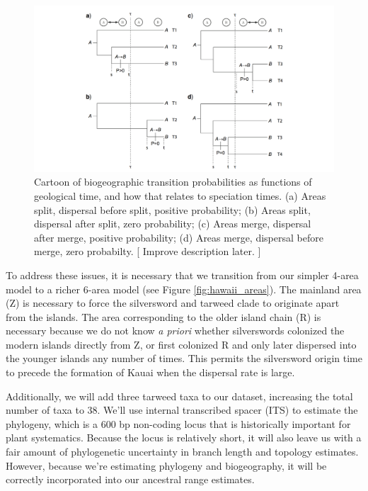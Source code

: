 \begin{figure}[!ht]
\centering
\includegraphics[width=\textwidth]{figures/fig_biogeo_dating.png}
\caption{Cartoon of biogeographic transition probabilities as functions of geological time, and how that relates to speciation times. (a) Areas split, dispersal before split, positive probability; (b) Areas split, dispersal after split, zero probability; (c) Areas merge, dispersal after merge, positive probability; (d) Areas merge, dispersal before merge, zero probabilty. [ Improve description later. ]}
\label{fig:biogeo_dating_cartoon}
\end{figure}

To address these issues, it is necessary that we transition from our simpler 4-area model to a richer 6-area model (see Figure \ref{fig:hawaii_areas}).
The mainland area (Z) is necessary to force the silversword and tarweed clade to originate apart from the islands.
The area corresponding to the older island chain (R) is necessary because we do not know {\it a priori} whether silverswords colonized the modern islands directly from Z, or first colonized R and only later dispersed into the younger islands any number of times.
This permits the silversword origin time to precede the formation of Kauai when the dispersal rate is large.

Additionally, we will add three tarweed taxa to our dataset, increasing the total number of taxa to 38.
We'll use internal transcribed spacer (ITS) to estimate the phylogeny, which is a 600 bp non-coding locus that is historically important for plant systematics.
Because the locus is relatively short, it will also leave us with a fair amount of phylogenetic uncertainty in branch length and topology estimates.
However, because we're estimating phylogeny and biogeography, it will be correctly incorporated into our ancestral range estimates.

